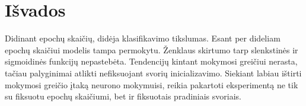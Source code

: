 \documentclass{VUMIFPSbakalaurinis}
\begin{document}
\section{Išvados}
Didinant epochų skaičių, didėja klasifikavimo tikslumas. Esant per dideliam
epochų skaičiui modelis tampa permokytu. Ženklaus skirtumo tarp slenkstinės
ir sigmoidinės funkcijų nepastebėta. Tendencijų kintant mokymosi greičiui nerasta,
tačiau palyginimai atlikti nefiksuojant svorių inicializavimo. Siekiant labiau ištirti
mokymosi greičio įtaką neurono mokymuisi, reikia pakartoti eksperimentą ne tik su
fiksuotu epochų skaičiumi, bet ir fiksuotais pradiniais svoriais.
\end{document}
